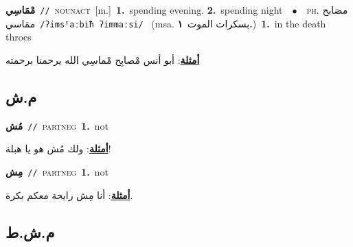 \documentclass[10pt,a4paper,twoside]{article} %
\begin{document}
\begin{multicols}{2}
{\setlength\topsep{0pt}\textbf{\foreignlanguage{arabic}{مْمَاسِي}}\ {\color{gray}\texttt{//}\color{black}}\ \textsc{noun\textunderscore act}\ [m.]\ \textbf{1.}~spending evening.  \textbf{2.}~spending night\ \ $\bullet$\ \ \textsc{ph.} \color{gray} \foreignlanguage{arabic}{مصَابح ممَاسي}\color{black}\ {\color{gray}\texttt{/{\sffamily ʔimsˤaːbiħ ʔimmaːsi}/}\color{black}}\ \color{gray} (msa. \foreignlanguage{arabic}{بسكرات الموت}~\foreignlanguage{arabic}{\textbf{١.}})\color{black}\ \textbf{1.}~in the death throes\  \begin{flushright}\color{gray}\foreignlanguage{arabic}{\textbf{\underline{\foreignlanguage{arabic}{أمثلة}}}: أبو أنس مْصابِح مْماسِي الله يرحمنا برحمته}\end{flushright}\color{black}} \vspace{2mm}

\vspace{-3mm}
\subsection*{\color{blue}\foreignlanguage{arabic}{م.ش}\color{blue}{ (ntws)}} 

{\setlength\topsep{0pt}\textbf{\foreignlanguage{arabic}{مُش}}\ {\color{gray}\texttt{//}\color{black}}\ \textsc{part\textunderscore neg}\ \textbf{1.}~not\  \begin{flushright}\color{gray}\foreignlanguage{arabic}{\textbf{\underline{\foreignlanguage{arabic}{أمثلة}}}: ولك مُش هو يا هبلة!}\end{flushright}\color{black}} \vspace{2mm}

{\setlength\topsep{0pt}\textbf{\foreignlanguage{arabic}{مِش}}\ {\color{gray}\texttt{//}\color{black}}\ \textsc{part\textunderscore neg}\ \textbf{1.}~not\  \begin{flushright}\color{gray}\foreignlanguage{arabic}{\textbf{\underline{\foreignlanguage{arabic}{أمثلة}}}: أنا مِش رايحة معكم بكرة.}\end{flushright}\color{black}} \vspace{2mm}

\vspace{-3mm}
\subsection*{\color{blue}\foreignlanguage{arabic}{م.ش.ط}\color{blue}{}} 


\end{multicols}
\end{document}
